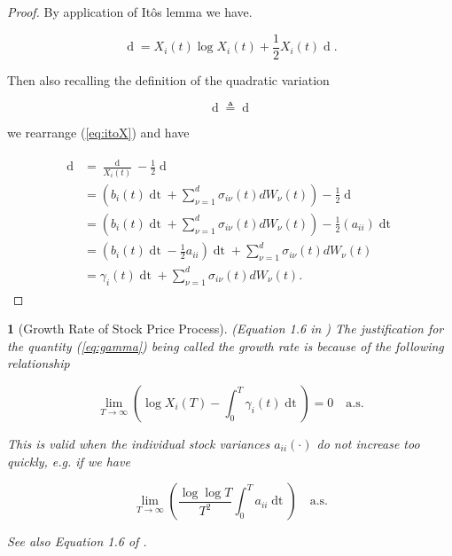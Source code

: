 \documentclass[british]{amsart}
\numberwithin{equation}{section}
\numberwithin{figure}{section}
\theoremstyle{plain}
\newtheorem{thm}{\protect\theoremname}[section]
\theoremstyle{definition}
\theoremstyle{plain}
\theoremstyle{plain}
\theoremstyle{plain}
\theoremstyle{remark}
\theoremstyle{plain}
\providecommand{\theoremname}{Theorem}
\renewcommand{\d}[1]{\mathop{\mathrm{d}{#1}}}
\newcommand{\defeq}{\mathop{\triangleq}}
\newcommand{\almostsurely}{\text{a.s.}}
\begin{document}
\begin{proof}

	By application of It\^{o}s lemma we have.

	\begin{equation}
		\label{eq:itoX}
		\d{X_{i}(t)} = X_{i}(t) \log{X_{i}(t)} + \frac{1}{2} X_{i}(t) \d{ \langle \log{X_{i}} \rangle_{t} }.
	\end{equation}

	Then also recalling the definition of the quadratic variation

	\begin{equation*}
		\d{ \langle \log{X_{i}} \rangle_{t} } \defeq \d{ \langle \log{X_{i}}, \log{X_{i}} \rangle_{t} } 
	\end{equation*}

	we rearrange (\ref{eq:itoX}) and have

	\begin{gather*}
		\begin{split}
			\d{\log{X_{i}(t)}} &= \frac{\d{X_{i}(t)}}{X_{i}(t)} - \frac{1}{2} \d{ \langle \log{X_{i}} \rangle_{t} } \\
				&= \left( b_{i}(t)\d{t} + \sum_{\nu=1}^{d} \sigma_{i\nu}(t) dW_{\nu}(t) \right)
					- \frac{1}{2} \d{ \langle \log{X_{i}} \rangle_{t} } \\
				&= \left( b_{i}(t)\d{t} + \sum_{\nu=1}^{d} \sigma_{i\nu}(t) dW_{\nu}(t) \right)
					- \frac{1}{2} \left( a_{ii} \right)\d{t} \\
				&= \left( b_{i}(t)\d{t} - \frac{1}{2}  a_{ii} \right)\d{t}  + \sum_{\nu=1}^{d} \sigma_{i\nu}(t) dW_{\nu}(t) \\
				&= \gamma_{i}(t) \d{t}  + \sum_{\nu=1}^{d} \sigma_{i\nu}(t) dW_{\nu}(t ).
		\end{split}
	\end{gather*}

\end{proof}

\begin{thm} [Growth Rate of Stock Price Process]
	\label{thm:growthrate}
	(Equation 1.6 in \cite{fernholz2009})
	The justification for the quantity (\ref{eq:gamma}) being called the 
	\textit{growth rate} is	because of the following relationship

	\begin{equation}
		\lim_{T \to \infty} 
			\left( 
			\log{X_{i}(T)} - \int_{0}^{T} \gamma_{i}(t)\d{t} 
			\right) = 0
		\quad \almostsurely
	\end{equation}

	This is valid when the individual stock variances $a_{ii}(\cdot)$ do not increase too quickly, e.g. if we have 


	\begin{equation*}
		\lim_{T\to\infty} \left( \frac{\log \log T}{T^2} \int_{0}^{T} a_{ii} \d{t} \right)
		\quad \almostsurely 
	\end{equation*}

	See also Equation 1.6 of \cite{fernholz2009}.

\end{thm}
\end{document}
